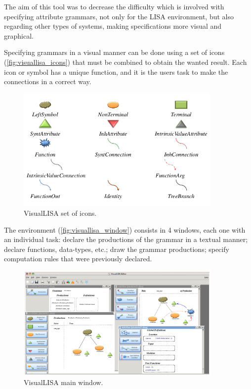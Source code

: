 The aim of this tool was to decrease the difficulty which is involved with specifying attribute grammars, not only for the LISA environment, but also regarding other types of systems, 
making specifications more visual and graphical.

Specifying grammars in a visual manner can be done using a set of icons (\autoref{fig:visuallisa_icons}) that must be combined to obtain the wanted result. 
Each icon or symbol has a unique function, and it is the users task to make the connections in a correct way.

\begin{figure}[h]
\centering
\includegraphics[width=10cm]{images/visuallisa_icons.png}
\caption{VisualLISA set of icons.}
\label{fig:visuallisa_icons}
\end{figure}

The environment (\autoref{fig:visuallisa_window}) consists in 4 windows, each one with an individual task: 
declare the productions of the grammar in a textual manner; 
declare functions, data-types, etc.; 
draw the grammar productions; 
specify computation rules that were previously declared.

\begin{figure}[h]
\centering
\includegraphics[width=10cm]{images/visuallisa_window.png}
\caption{VisualLISA main window.}
\label{fig:visuallisa_window}
\end{figure}

